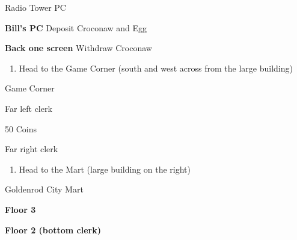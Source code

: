 \begin{paracol}{2}
\begin{story}{Radio Tower PC}
	\varwb
	\begin{pokeMenuStory}
		\item \textbf{Bill's PC}  \pointRight{} Deposit  \pointRight{} Croconaw and Egg
		\item \textbf{Back one screen}  \pointRight{} Withdraw  \pointRight{} Croconaw
	\end{pokeMenuStory}
	\varwe
\end{story}

\begin{enumerate}[resume]
	\item Head to the Game Corner (south and west across from the large building)
\end{enumerate}

\begin{shop}{Game Corner}
	\varwb
	\begin{shopSection}{Far left clerk}
		\item {} 50 Coins 
	\end{shopSection}
	\begin{shopSection}{Far right clerk}
		\item {} \abra
	\end{shopSection}
	\varwe
\end{shop}

\begin{enumerate}[resume]
	\item Head to the Mart (large building on the right)
\end{enumerate}

\begin{shop}{Goldenrod City Mart}
	\varwb
	\begin{notes}
		\item \textbf{Floor 3}
	\end{notes}
	\begin{sell}
		\item  {} \mudSlap
		\item {} \attract
	\end{sell}
	\begin{buy}
		\item {} \xSpeed
		\item \shopHl{(\pointDown)} \xSpecial
		\item \shopHl{(2\pointDown)} \xAttack{} 
	\end{buy}
	\begin{notes}
		\item \textbf{Floor 2 (bottom clerk)}
	\end{notes}
	\begin{buy}
		\item \shopHl{(2\pointDown)} \escapeRope{} \shopHlTwo{5x}
		\item \shopHl{(3\pointDown)} \fullHeal{} \shopHlTwo{3x}
	\end{buy}
	\varwe
\end{shop}


\end{paracol}
